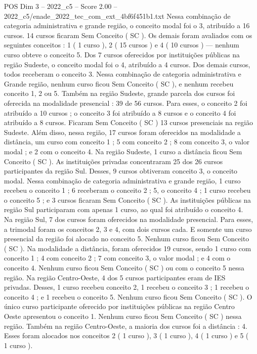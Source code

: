 \begin{textsample}{POS Dim 3 – 2022\_c5 – Score 2.00 – 2022\_c5/enade\_2022\_tec\_com\_ext\_4bf6f451b1.txt}
Nessa combinação de categoria administrativa e grande região, o conceito modal foi o 3, atribuído a 16 cursos. 14 cursos ficaram Sem Conceito ( SC ).
Os demais foram avaliados com os seguintes conceitos : 1 ( 1 curso ), 2 ( 15 cursos ) e 4 ( 10 cursos ) — nenhum curso obteve o conceito 5.
Dos 7 cursos oferecidos por instituições públicas na região Sudeste, o conceito modal foi o 4, atribuído a 4 cursos.
Dos demais cursos, todos receberam o conceito 3.
Nessa combinação de categoria administrativa e Grande região, nenhum curso ficou Sem Conceito ( SC ), e nenhum recebeu conceito 1, 2 ou 5.
Também na região Sudeste, grande parcela dos cursos foi oferecida na modalidade presencial : 39 de 56 cursos.
Para esses, o conceito 2 foi atribuído a 10 cursos ; o conceito 3 foi atribuído a 8 cursos e o conceito 4 foi atribuído a 8 cursos.
Ficaram Sem Conceito ( SC ) 13 cursos presenciais na região Sudeste.
Além disso, nessa região, 17 cursos foram oferecidos na modalidade a distância, um curso com conceito 1 ; 5 com conceito 2 ; 8 com conceito 3, o valor modal ; e 2 com o conceito 4.
Na região Sudeste, 1 curso a distância ficou Sem Conceito ( SC ).
As instituições privadas concentraram 25 dos 26 cursos participantes da região Sul.
Desses, 9 cursos obtiveram conceito 3, o conceito modal.
Nessa combinação de categoria administrativa e grande região, 1 curso recebeu o conceito 1 ; 6 receberam o conceito 2 ; 5, o conceito 4 ; 1 curso recebeu o conceito 5 ; e 3 cursos ficaram Sem Conceito ( SC ).
As instituições públicas na região Sul participaram com apenas 1 curso, ao qual foi atribuído o conceito 4.
Na região Sul, 7 dos cursos foram oferecidos na modalidade presencial.
Para esses, a trimodal foram os conceitos 2, 3 e 4, com dois cursos cada.
E somente um curso presencial da região foi alocado no conceito 5.
Nenhum curso ficou Sem Conceito ( SC ).
Na modalidade a distância, foram oferecidos 19 cursos, sendo 1 curso com conceito 1 ; 4 com conceito 2 ; 7 com conceito 3, o valor modal ; e 4 com o conceito 4.
Nenhum curso ficou Sem Conceito ( SC ) ou com o conceito 5 nessa região.
Na região Centro-Oeste, 4 dos 5 cursos participantes eram de IES privadas.
Desses, 1 curso recebeu conceito 2, 1 recebeu o conceito 3 ; 1 recebeu o conceito 4 ; e 1 recebeu o conceito 5.
Nenhum curso ficou Sem Conceito ( SC ).
O único curso participante oferecido por instituições públicas na região Centro Oeste apresentou o conceito 1.
Nenhum curso ficou Sem Conceito ( SC ) nessa região.
Também na região Centro-Oeste, a maioria dos cursos foi a distância : 4.
Esses foram alocados nos conceitos 2 ( 1 curso ), 3 ( 1 curso ), 4 ( 1 curso ) e 5 ( 1 curso ).

\end{textsample}
